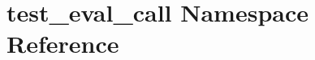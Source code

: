 \hypertarget{namespacetest__eval__call}{}\section{test\+\_\+eval\+\_\+call Namespace Reference}
\label{namespacetest__eval__call}
